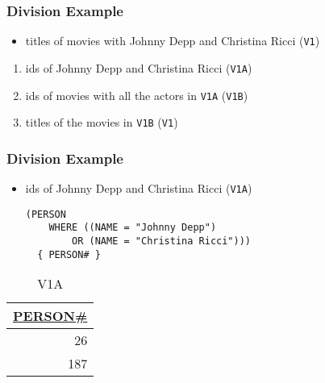 \documentclass[dvipsnames]{beamer}
\theoremstyle{plain}
\begin{document}
\begin{frame}
  \frametitle{Division Example}

  \begin{itemize}
    \item titles of movies with Johnny Depp and Christina Ricci (\texttt{V1})
  \end{itemize}

  \pause
  \begin{enumerate}
    \item ids of Johnny Depp and Christina Ricci (\texttt{V1A})

    \pause
    \item ids of movies with all the actors in \texttt{V1A} (\texttt{V1B})

    \pause
    \item titles of the movies in \texttt{V1B} (\texttt{V1})
  \end{enumerate}
\end{frame}

\begin{frame}[fragile]
  \frametitle{Division Example}

  \begin{itemize}
    \item ids of Johnny Depp and Christina Ricci (\texttt{V1A})
    \begin{lstlisting}
(PERSON
    WHERE ((NAME = "Johnny Depp")
        OR (NAME = "Christina Ricci")))
  { PERSON# }
    \end{lstlisting}
  \end{itemize}

  \vspace{-10pt}
  \begin{tiny}
  \begin{table}
    \caption{V1A}
    \begin{tabular}{|r|}\hline
\underline{PERSON\#}\\[2pt]\hline\hline
                26\\\hline
                187\\\hline
    \end{tabular}
  \end{table}
  \end{tiny}
\end{frame}
\end{document}
